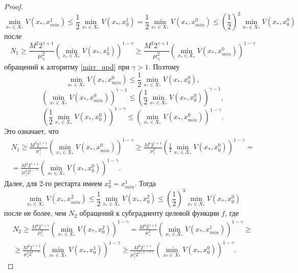 \begin{proof}
        $$
            \min\limits_{x_* \in X_*}{V(x_*, x_{min}^1)} \leq \frac{1}{2} \min\limits_{x_* \in X_*}{V(x_*, x_0^1)} = \frac{1}{2} \min\limits_{x_* \in X_*}{V(x_*, x_{min}^0)} \leq \left(\frac{1}{2}\right)^2 \min\limits_{x_* \in X_*}{V(x_*, x_0^0)}
        $$
        после
        $$
            N_1 \geq \frac{M^2 2^{\gamma + 1}}{\mu_{\gamma}^2} \left(\min\limits_{x_* \in X_*}{V(x_*, x_0^1)}\right)^{1 - \gamma} \geq \frac{M^2 2^{\gamma + 1}}{\mu_{\gamma}^2} \left(\min\limits_{x_* \in X_*}{V(x_*, x_{min}^0)}\right)^{1 - \gamma} 
        $$
        обращений к алгоритму \eqref{mirr_upd} при $\gamma > 1$. Поэтому
        $$
            \min\limits_{x_* \in X_*}{V(x_*, x_{min}^0)} \leq \frac{1}{2}\min\limits_{x_* \in X_*}{V(x_*, x_0^0)},
        $$
        $$
            \left(\min\limits_{x_* \in X_*}{V(x_*, x_{min}^0)}\right)^{\gamma - 1} \leq \left(\frac{1}{2} \min\limits_{x_* \in X_*}{V(x_*, x_0^0)}\right)^{\gamma - 1},
        $$
        $$
             \left(\frac{1}{2} \min\limits_{x_* \in X_*}{V(x_*, x_0^0)}\right)^{1 - \gamma} \leq \left(\min\limits_{x_* \in X_*}{V(x_*, x_{min}^0)}\right)^{1 - \gamma}.
        $$
        Это означает, что
        $$
        \begin{aligned}
            N_1 \geq \frac{M^2 2^{\gamma + 1}}{\mu_{\gamma}^2} \left(\min\limits_{x_* \in X_*}{V(x_*, x_{min}^0)}\right)^{1 - \gamma} \geq \frac{M^2 2^{\gamma + 1}}{\mu_{\gamma}^2} \left(\frac{1}{2} \min\limits_{x_* \in X_*}{V(x_*, x_0^0)}\right)^{1 - \gamma} =\\
            = \frac{M^2 2^{\gamma + 1}}{\mu_{\gamma}^2 2^{1-\gamma}} \left(\min\limits_{x_* \in X_*}{V(x_*, x_0^0)}\right)^{1 - \gamma}.
        \end{aligned}
        $$
        Далее, для 2-го рестарта имеем $x_0^2 = x_{min}^1$. Тогда
        $$
            \min\limits_{x_* \in X_*}{V(x_*, x_{min}^2)} \leq \frac{1}{2} \min\limits_{x_* \in X_*}{V(x_*, x_0^2)} \leq \left(\frac{1}{2}\right)^3 \min\limits_{x_* \in X_*}{V(x_*, x_0^0)} 
        $$
        после не более, чем $N_2$ обращений к субградиенту целевой функции $f$, где
        $$
        \begin{aligned}
            N_2 \geq \frac{M^2 2^{\gamma + 1}}{\mu_{\gamma}^2} \left(\min\limits_{x_* \in X_*}{V(x_*, x_0^2)}\right)^{1 - \gamma} = \frac{M^2 2^{\gamma + 1}}{\mu_{\gamma}^2} \left(\min\limits_{x_* \in X_*}{V(x_*, x_{min}^1)}\right)^{1 - \gamma} \geq\\
            \geq \frac{M^2 2^{\gamma + 1}}{\mu_{\gamma}^2 2^{1 - \gamma}} \left(\min\limits_{x_* \in X_*}{V(x_*, x_0^1)}\right)^{1 - \gamma} \geq \frac{M^2 2^{\gamma + 1}}{\mu_{\gamma}^2 2^{2(1 - \gamma)}} \left(\min\limits_{x_* \in X_*}{V(x_*, x_0^0)}\right)^{1 - \gamma}.

\end{aligned}$$
\end{proof}
